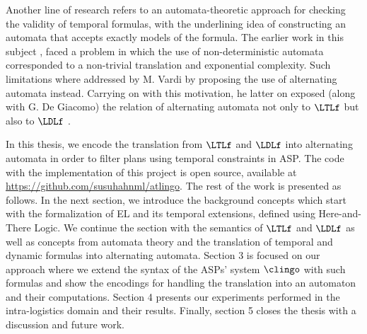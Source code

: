 Another line of research refers to an automata-theoretic approach for checking the validity of temporal formulas, with the underlining idea of constructing an automata that accepts exactly models of the formula. 
The earlier work in this subject \cite{varwol86a}, faced a problem in which the use of non-deterministic automata corresponded to a non-trivial translation and exponential complexity. Such limitations where addressed by M. Vardi \cite{vardi97a} by proposing the use of alternating automata instead.
Carrying on with this motivation, he latter on exposed (along with G. De Giacomo) the relation of alternating automata not only to $\LTLf$ but also to $\LDLf$ \cite{giavar13a}.


In this thesis, we encode the translation from $\LTLf$ and $\LDLf$ into alternating automata in order to filter plans using temporal constraints in ASP. The code with the implementation of this project is open source, available at \url{https://github.com/susuhahnml/atlingo}. The rest of the work is presented as follows. In the next section, we introduce the background concepts which start with the formalization of EL and its temporal extensions, defined using Here-and-There Logic. We continue the section with the semantics of $\LTLf$ and $\LDLf$ as well as concepts from automata theory and the translation of temporal and dynamic formulas into alternating automata. Section 3 is focused on our approach where we extend the syntax of the ASPs' system $\clingo$ with such formulas and show the encodings for handling the translation into an automaton and their computations. Section 4 presents our experiments performed in the intra-logistics domain and their results. Finally, section 5 closes the thesis with a discussion and future work.